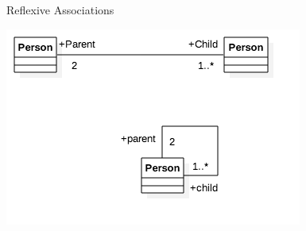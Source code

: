 \documentclass[10pt,t,a4paper]{beamer}
\begin{document}
\begin{frame}[label={sec:org394fff4}]{Reflexive Associations}
\begin{center}
\includegraphics[width=.9\linewidth]{./IReflexive.png}
\end{center}
\end{frame}
\end{document}
